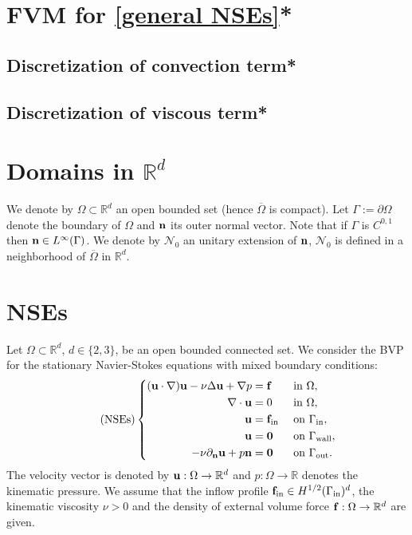 \documentclass[oneside,11pt]{book}
\numberwithin{equation}{section}
\begin{document}
\section{FVM for \eqref{general NSEs}*}

\subsection{Discretization of convection term*}

\subsection{Discretization of viscous term*}

\section{Domains in $\mathbb{R}^d$}
We denote by $\Omega\subset\mathbb{R}^d$ an open bounded set (hence $\overline{\Omega}$ is compact).  Let $\Gamma := \partial\Omega$ denote the boundary of $\Omega$ and ${\bf n}$ its outer normal vector. Note that if $\Gamma$ is $C^{0,1}$ then ${\bf n}\in L^\infty(\Gamma)$. We denote by $\mathcal{N}_0$ an unitary extension of ${\bf n}$, $\mathcal{N}_0$ is defined in a neighborhood of $\overline{\Omega}$ in $\mathbb{R}^d$.

\section{NSEs}
Let $\Omega\subset\mathbb{R}^d$, $d\in\{2,3\}$, be an open bounded connected set. We consider the BVP for the stationary Navier-Stokes equations with mixed boundary conditions:
\begin{equation}
    \label{NSEs}
    \tag{NSEs}
    \left\{\begin{split}
        ({\bf u}\cdot\nabla){\bf u} - \nu\Delta{\bf u} + \nabla p &= {\bf f} &&\mbox{ in } \Omega,\\
        \nabla\cdot{\bf u} &= 0 &&\mbox{ in } \Omega,\\
        {\bf u} &= {\bf f}_{\rm in} &&\mbox{ on } \Gamma_{\rm in},\\
        {\bf u} &= {\bf 0} &&\mbox{ on } \Gamma_{\rm wall},\\
        -\nu\partial_{\bf n}{\bf u} + p{\bf n} &= {\bf 0} &&\mbox{ on } \Gamma_{\rm out}.
    \end{split}\right.
\end{equation}
The velocity vector is denoted by ${\bf u}:\Omega\to\mathbb{R}^d$ and $p:\Omega\to\mathbb{R}$ denotes the kinematic pressure. We assume that the inflow profile ${\bf f}_{\rm in}\in H^{1/2}(\Gamma_{\rm in})^d$, the kinematic viscosity $\nu > 0$ and the density of external volume force ${\bf f}:\Omega\to\mathbb{R}^d$ are given.
\end{document}
